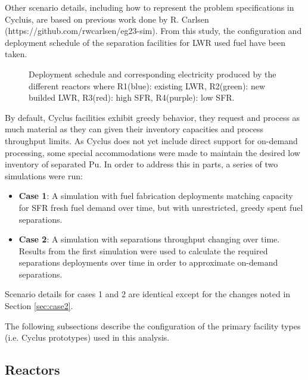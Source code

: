 \documentclass[12pt]{article}
\begin{document}
Other scenario details, including how to represent the problem specifications in Cycluis,
are based on previous work done by R. Carlsen
(https://github.com/rwcarlsen/eg23-sim).  From this study, the configuration
and deployment schedule of the separation facilities for LWR used fuel have
been taken.

\begin{figure}[h!]
    \centering
    \caption{
        Deployment schedule and corresponding electricity produced by the
        different reactors where R1(blue): existing LWR, R2(green): new
        builded LWR, R3(red): high SFR, R4(purple): low
        SFR.\label{fig:deployment}
    }
\end{figure}

By default, Cyclus facilities exhibit greedy behavior, they request and
process as much material as they can given their inventory capacities and
process throughput limits. As Cyclus does not yet include direct support for on-demand
processing, some special accommodations were made to maintain the desired low
inventory of separated Pu. In order to address this in parts, a series of two
simulations were run:

\begin{itemize}

    \item \textbf{Case 1}: A simulation with fuel fabrication deployments
        matching capacity for SFR fresh fuel demand over time, but with
        unrestricted, greedy spent fuel separations.

    \item \textbf{Case 2}: A simulation with separations throughput changing
        over time. Results from the first simulation were used to calculate
        the required separations deployments over time in order to approximate
        on-demand separations.

\end{itemize}

Scenario details for cases 1 and 2 are identical except for the changes noted in
Section \ref{sec:case2}.

The following subsections describe the configuration of the primary facility
types (i.e. Cyclus prototypes) used in this analysis.

\subsection{Reactors}
\end{document}
